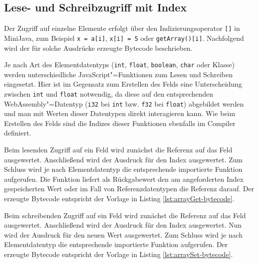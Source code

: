 \subsection{Lese- und Schreibzugriff mit Index}
\label{subsec:Lese-und-Schreibzugriff-mit-Index}

Der Zugriff auf einzelne Elemente erfolgt über den Indizierungsoperator \lstinline{[]} in MiniJava, zum Beispiel \lstinline{x = a[i]}, \lstinline{x[i] = 5} oder \lstinline{getArray()[i]}. Nachfolgend wird der für solche Ausdrücke erzeugte Bytecode beschrieben.

Je nach Art des Elementdatentyps (\lstinline{int}, \lstinline{float}, \lstinline{boolean}, \lstinline{char} oder Klasse) werden unterschiedliche JavaScript"=Funktionen zum Lesen und Schreiben eingesetzt. Hier ist im Gegensatz zum Erstellen des Felds eine Unterscheidung zwischen \lstinline{int} und \lstinline{float} notwendig, da diese auf den entsprechenden WebAssembly"=Datentyp (\lstinline{i32} bei \lstinline{int} bzw. \lstinline{f32} bei \lstinline{float}) abgebildet werden und man mit Werten dieser Datentypen direkt interagieren kann. Wie beim Erstellen des Felds sind die Indizes dieser Funktionen ebenfalls im Compiler definiert.

Beim lesenden Zugriff auf ein Feld wird zunächst die Referenz auf das Feld ausgewertet. Anschließend wird der Ausdruck für den Index ausgewertet. Zum Schluss wird je nach Elementdatentyp die entsprechende importierte Funktion aufgerufen. Die Funktion liefert als Rückgabewert den am angeforderten Index gespeicherten Wert oder im Fall von Referenzdatentypen die Referenz darauf. Der erzeugte Bytecode entspricht der Vorlage in Listing \ref{lst:arrayGet-bytecode}.



Beim schreibenden Zugriff auf ein Feld wird zunächst die Referenz auf das Feld ausgewertet. Anschließend wird der Ausdruck für den Index ausgewertet. Nun wird der Ausdruck für den neuen Wert ausgewertet. Zum Schluss wird je nach Elementdatentyp die entsprechende importierte Funktion aufgerufen. Der erzeugte Bytecode entspricht der Vorlage in Listing \ref{lst:arraySet-bytecode}.



